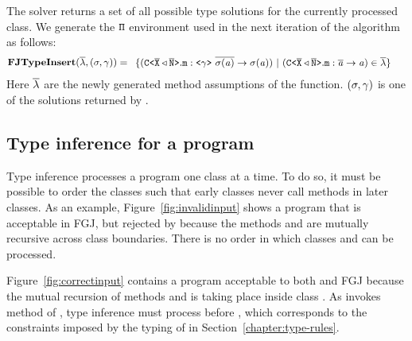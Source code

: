 \documentclass[a4paper,USenglish,cleveref, autoref, thm-restate, anonymous]{lipics-v2021}
\begin{document}

The solver \unify{} returns a set of all possible type solutions for the currently processed class.
We generate the ${\tt \Pi}$ environment used in the next iteration of the \fjtype{} algorithm as follows:
\begin{align*}
  \fjtypeInsert{}(\overline{\methodAssumption}, (\sigma, \unifyGenerics{})) & = \begin{array}{l}
    \set{(\exptype{C}{\ol{X} \triangleleft \ol{N}}.\mv{m} : \exptype{}{\unifyGenerics{}}\ \ol{\sigma(\tv{a})} \to \sigma(\tv{a})) \ |\ (\exptype{C}{\ol{X} \triangleleft \ol{N}}.\mv{m} : \ol{\tv{a}} \to \tv{a}) \in \overline{\methodAssumption}}
  \end{array} 
\end{align*}
Here $\overline{\mathtt{\lambda}}$ are the newly generated method assumptions of the \fjtype{} function.
$(\sigma, \gamma{})$ is one of the solutions returned by \unify{}.
\fi

\subsection{Type inference for a program }
\label{sec:proc-mult-class}

{Type inference processes a program one class at a time.
To do so, it must be possible to order the classes such that early
classes never call methods in later classes.
As an example, Figure~\ref{fig:invalidinput} shows a program that is
acceptable in FGJ, but rejected by \TFGJ because the methods 
and  are mutually recursive across class boundaries. There is
no order in which classes  and  can be processed.

Figure~\ref{fig:correctinput} contains a program
acceptable to both \TFGJ and FGJ because the mutual recursion of
methods  and  is taking place inside class . As
 invokes method  of , type inference must process
 before , which corresponds to the constraints imposed
by the typing of \TFGJ in Section~\ref{chapter:type-rules}.}
\end{document}
